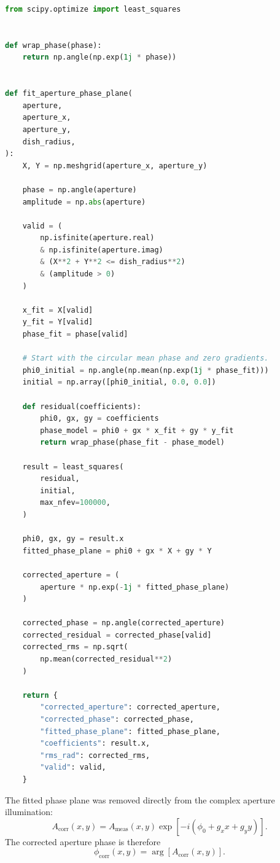 \documentclass[12pt]{extarticle}
\begin{document}
\begin{lstlisting}[language=Python]
from scipy.optimize import least_squares


def wrap_phase(phase):
    return np.angle(np.exp(1j * phase))


def fit_aperture_phase_plane(
    aperture,
    aperture_x,
    aperture_y,
    dish_radius,
):
    X, Y = np.meshgrid(aperture_x, aperture_y)

    phase = np.angle(aperture)
    amplitude = np.abs(aperture)

    valid = (
        np.isfinite(aperture.real)
        & np.isfinite(aperture.imag)
        & (X**2 + Y**2 <= dish_radius**2)
        & (amplitude > 0)
    )

    x_fit = X[valid]
    y_fit = Y[valid]
    phase_fit = phase[valid]

    # Start with the circular mean phase and zero gradients.
    phi0_initial = np.angle(np.mean(np.exp(1j * phase_fit)))
    initial = np.array([phi0_initial, 0.0, 0.0])

    def residual(coefficients):
        phi0, gx, gy = coefficients
        phase_model = phi0 + gx * x_fit + gy * y_fit
        return wrap_phase(phase_fit - phase_model)

    result = least_squares(
        residual,
        initial,
        max_nfev=100000,
    )

    phi0, gx, gy = result.x
    fitted_phase_plane = phi0 + gx * X + gy * Y

    corrected_aperture = (
        aperture * np.exp(-1j * fitted_phase_plane)
    )

    corrected_phase = np.angle(corrected_aperture)
    corrected_residual = corrected_phase[valid]
    corrected_rms = np.sqrt(
        np.mean(corrected_residual**2)
    )

    return {
        "corrected_aperture": corrected_aperture,
        "corrected_phase": corrected_phase,
        "fitted_phase_plane": fitted_phase_plane,
        "coefficients": result.x,
        "rms_rad": corrected_rms,
        "valid": valid,
    }
\end{lstlisting}

The fitted phase plane was removed directly from the complex aperture illumination:
\begin{equation}
A_{\mathrm{corr}}(x,y)
=
A_{\mathrm{meas}}(x,y)
\exp\left[
-i\left(
\phi_0+g_xx+g_yy
\right)
\right].
\end{equation}
The corrected aperture phase is therefore
\begin{equation}
\phi_{\mathrm{corr}}(x,y)
=
\arg\left[A_{\mathrm{corr}}(x,y)\right].
\end{equation}
\end{document}
